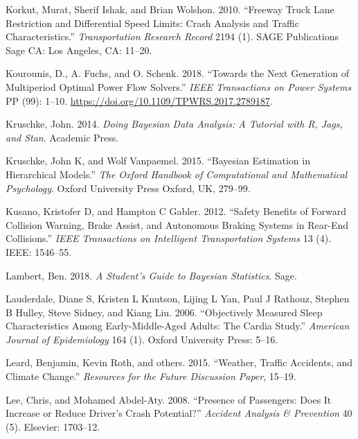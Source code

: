 \documentclass[12pt]{book}
\numberwithin{equation}{chapter}
\begin{document}
\leavevmode\hypertarget{ref-korkut2010freeway}{}%
Korkut, Murat, Sherif Ishak, and Brian Wolshon. 2010. ``Freeway Truck Lane Restriction and Differential Speed Limits: Crash Analysis and Traffic Characteristics.'' \emph{Transportation Research Record} 2194 (1). SAGE Publications Sage CA: Los Angeles, CA: 11--20.

\leavevmode\hypertarget{ref-Kourounis2018}{}%
Kourounis, D., A. Fuchs, and O. Schenk. 2018. ``Towards the Next Generation of Multiperiod Optimal Power Flow Solvers.'' \emph{IEEE Transactions on Power Systems} PP (99): 1--10. \url{https://doi.org/10.1109/TPWRS.2017.2789187}.

\leavevmode\hypertarget{ref-kruschke2014doing}{}%
Kruschke, John. 2014. \emph{Doing Bayesian Data Analysis: A Tutorial with R, Jags, and Stan}. Academic Press.

\leavevmode\hypertarget{ref-kruschke2015bayesian}{}%
Kruschke, John K, and Wolf Vanpaemel. 2015. ``Bayesian Estimation in Hierarchical Models.'' \emph{The Oxford Handbook of Computational and Mathematical Psychology}. Oxford University Press Oxford, UK, 279--99.

\leavevmode\hypertarget{ref-kusano2012safety}{}%
Kusano, Kristofer D, and Hampton C Gabler. 2012. ``Safety Benefits of Forward Collision Warning, Brake Assist, and Autonomous Braking Systems in Rear-End Collisions.'' \emph{IEEE Transactions on Intelligent Transportation Systems} 13 (4). IEEE: 1546--55.

\leavevmode\hypertarget{ref-lambert2018student}{}%
Lambert, Ben. 2018. \emph{A Student's Guide to Bayesian Statistics}. Sage.

\leavevmode\hypertarget{ref-lauderdale2006objectively}{}%
Lauderdale, Diane S, Kristen L Knutson, Lijing L Yan, Paul J Rathouz, Stephen B Hulley, Steve Sidney, and Kiang Liu. 2006. ``Objectively Measured Sleep Characteristics Among Early-Middle-Aged Adults: The Cardia Study.'' \emph{American Journal of Epidemiology} 164 (1). Oxford University Press: 5--16.

\leavevmode\hypertarget{ref-leard2015weather}{}%
Leard, Benjamin, Kevin Roth, and others. 2015. ``Weather, Traffic Accidents, and Climate Change.'' \emph{Resources for the Future Discussion Paper}, 15--19.

\leavevmode\hypertarget{ref-lee2008presence}{}%
Lee, Chris, and Mohamed Abdel-Aty. 2008. ``Presence of Passengers: Does It Increase or Reduce Driver's Crash Potential?'' \emph{Accident Analysis \& Prevention} 40 (5). Elsevier: 1703--12.
\end{document}
